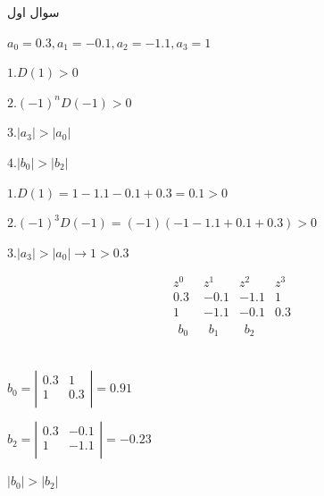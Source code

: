 \documentclass[12pt]{article}
\begin{document}
 \begin{problem}{سوال اول}
 	    	\raggedleft
 	
 	
 	$a_0 = 0.3 , a_1 = -0.1 , a_2 = -1.1 , a_3 = 1$
 	
 	
 	\centering
 	$1. D(1) > 0$
 	
 	$2. (-1)^nD(-1) > 0$
 	
 	$3. |a_3| > |a_0|$
 	
 	$4. |b_0| > |b_2| $
 	
 	\raggedleft
 	
 	$1. D(1) = 1 - 1.1 - 0.1 + 0.3 = 0.1 > 0$
 	
 	$2. (-1)^3 D(-1) = (-1)(-1 -1.1 +0.1 +0.3) > 0$
 	
 	$3.\left| {{a}_{3}} \right|>\left| {{a}_{0}} \right|\to 1>0.3$
 	
 	\raggedleft
 	
 	\centering
 	\[\begin{matrix}
 		{{z}^{0}} & {{z}^{1}} & {{z}^{2}} & {{z}^{3}}  \\
 		0.3 & -0.1 & -1.1 & 1  \\
 		1 & -1.1 & -0.1 & 0.3  \\
 		\begin{matrix}
 			{{b}_{0}}  \\
 			{}  \\
 		\end{matrix} & \begin{matrix}
 			{{b}_{1}}  \\
 			{}  \\
 		\end{matrix} & \begin{matrix}
 			{{b}_{2}}  \\
 			{}  \\
 		\end{matrix} & {}  \\
 	\end{matrix}\]
 	
 	\raggedleft
 	
 	${{b}_{0}}=\left| \begin{matrix}
 		0.3 & 1  \\
 		1 & 0.3  \\
 	\end{matrix} \right| = 0.91$
 	
 	${{b}_{2}}=\left| \begin{matrix}
 		0.3 & -0.1  \\
 		1 & -1.1  \\
 	\end{matrix} \right| = -0.23$
 	
 	$|b_0| > |b_2|$
 	
 	
    \end{problem}
    
\end{document}
